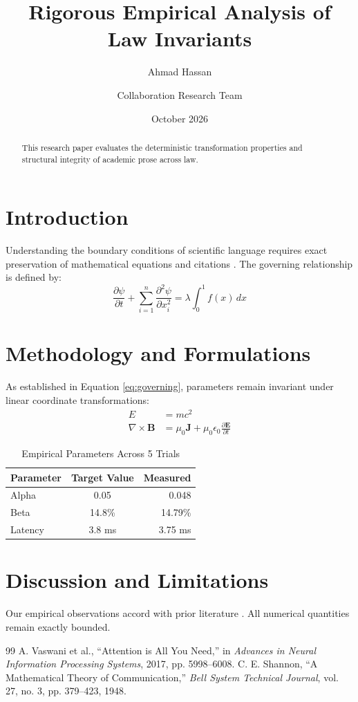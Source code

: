 \documentclass[11pt,a4paper]{article}
\title{Rigorous Empirical Analysis of Law Invariants}
\author{Ahmad Hassan \and Collaboration Research Team}
\date{October 2026}
\begin{document}
\maketitle

\begin{abstract}
This research paper evaluates the deterministic transformation properties and structural integrity of academic prose across law.
\end{abstract}

\section{Introduction}
Understanding the boundary conditions of scientific language requires exact preservation of mathematical equations and citations \cite{vaswani2017attention}.
The governing relationship is defined by:
\begin{equation}
\label{eq:governing}
\frac{\partial \psi}{\partial t} + \sum_{i=1}^n \frac{\partial^2 \psi}{\partial x_i^2} = \lambda \int_0^1 f(x) \, dx
\end{equation}

\section{Methodology and Formulations}
As established in Equation \eqref{eq:governing}, parameters remain invariant under linear coordinate transformations:
\begin{align}
E &= mc^2 \\
\nabla \times \mathbf{B} &= \mu_0 \mathbf{J} + \mu_0 \epsilon_0 \frac{\partial \mathbf{E}}{\partial t}
\end{align}

\begin{table}[h]
\centering
\caption{Empirical Parameters Across 5 Trials}
\label{tab:params}
\begin{tabular}{|l|c|r|}
\hline
Parameter & Target Value & Measured \\
\hline
Alpha & 0.05 & 0.048 \\
Beta & 14.8\% & 14.79\% \\
Latency & 3.8 ms & 3.75 ms \\
\hline
\end{tabular}
\end{table}

\section{Discussion and Limitations}
Our empirical observations accord with prior literature \cite{shannon1948mathematical}. All numerical quantities remain exactly bounded.

\begin{thebibliography}{99}
A. Vaswani et al., ``Attention is All You Need,'' in \textit{Advances in Neural Information Processing Systems}, 2017, pp. 5998--6008.
C. E. Shannon, ``A Mathematical Theory of Communication,'' \textit{Bell System Technical Journal}, vol. 27, no. 3, pp. 379--423, 1948.
\end{thebibliography}
\end{document}

